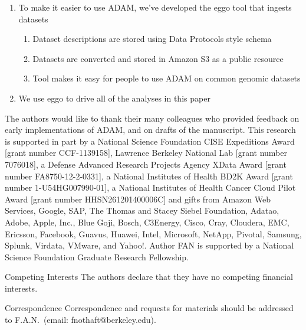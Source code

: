\documentclass{nature}
\begin{document}
\begin{methods}
\begin{refsegment}
\begin{enumerate}
\item To make it easier to use ADAM, we've developed the eggo tool that ingests datasets
\begin{enumerate}
\item Dataset descriptions are stored using Data Protocols style schema~\cite{dataprotocols}
\item Datasets are converted and stored in Amazon S3 as a public resource
\item Tool makes it easy for people to use ADAM on common genomic datasets
\end{enumerate}
\item We use eggo to drive all of the analyses in this paper
\end{enumerate}

\printbibliography[segment=2]

\end{refsegment}
\end{methods}

\begin{addendum}
\item The authors would like to thank their many colleagues who provided feedback on early implementations of
ADAM, and on drafts of the manuscript. This research is supported in part by a National Science Foundation CISE Expeditions Award
[grant number CCF-1139158], Lawrence Berkeley National Lab [grant number 7076018], a Defense
Advanced Research Projects Agency XData Award [grant number FA8750-12-2-0331], a National
Institutes of Health BD2K Award [grant number 1-U54HG007990-01], a National Institutes of Health Cancer
Cloud Pilot Award [grant number HHSN261201400006C] and gifts from Amazon Web Services, Google,
SAP, The Thomas and Stacey Siebel Foundation, Adatao, Adobe, Apple, Inc., Blue Goji, Bosch, C3Energy,
Cisco, Cray, Cloudera, EMC, Ericsson, Facebook, Guavus, Huawei, Intel, Microsoft, NetApp, Pivotal,
Samsung, Splunk, Virdata, VMware, and Yahoo!. Author FAN is supported by a National Science
Foundation Graduate Research Fellowship.
\item[Competing Interests] The authors declare that they have no
competing financial interests.
\item[Correspondence] Correspondence and requests for materials should be addressed to
\linebreak F.A.N.~(email: fnothaft@berkeley.edu).
\end{addendum}
\end{document}

